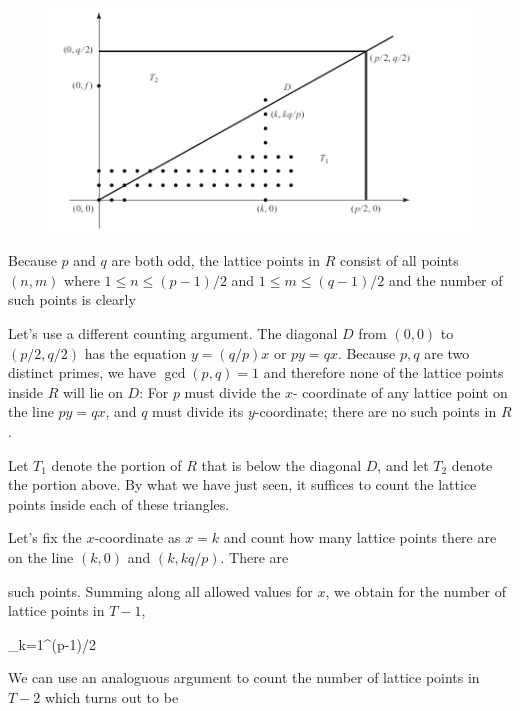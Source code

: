 \begin{figure}[H]
    \centering
    \includegraphics[scale=0.75]{images/2023_02_27_quadr_reci_01.png}
\end{figure}

Because $p$ and $q$ are both odd, the lattice points in $R$ consist of all points $(n,m)$ where $1 \leq n \leq (p-1)/2$ and $1 \leq m \leq (q-1)/2$ and the number of such points is clearly

\be\label{2023-02-27:eq2}
 \cdot {}
\ee

Let's use a different counting argument. The diagonal $D$ from $(0,0)$ to $(p/2,q/2)$ has the equation $y = (q/p)x$ or $py = qx$. Because $p, q$ are two distinct primes, we have $\gcd(p,q) = 1$ and therefore none of the lattice points inside $R$ will lie on $D$: For $p$ must divide the $x$- coordinate of any lattice point on the line $py = qx$, and $q$ must divide its $y$-coordinate; there are no such points in $R$.

Let $T_1$ denote the portion of $R$ that is below the diagonal $D$, and let $T_2$ denote the portion above. By what we have just seen, it suffices to count the lattice points inside each of these triangles.

Let's fix the $x$-coordinate as $x=k$ and count how many lattice points there are on the line $(k,0)$ and $(k, kq/p)$. There are 

\bee
{}
\eee

such points. Summing along all allowed values for $x$, we obtain for the number of lattice points in $T-1$,

\be\label{2023-02-27:eq3}
\sum_{k=1}^{(p-1)/2} 
\ee

We can use an analoguous argument to count the number of lattice points in $T-2$ which turns out to be 

